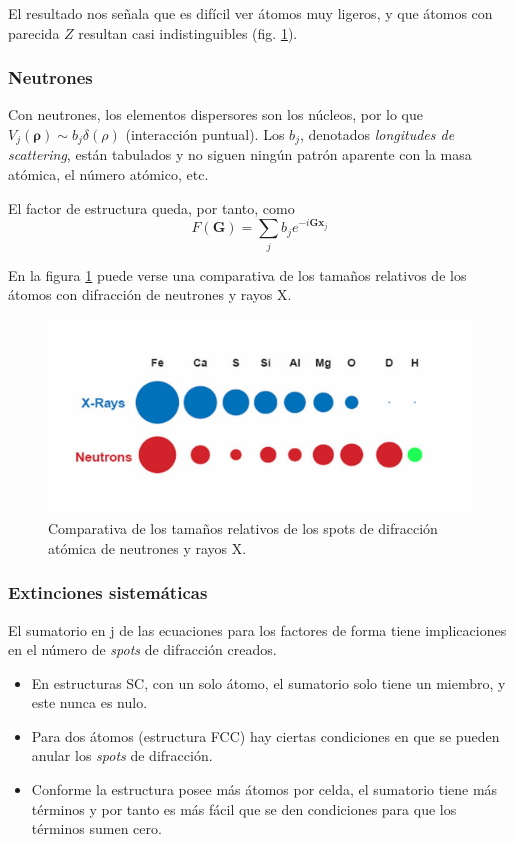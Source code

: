 El resultado nos señala que es difícil ver átomos muy ligeros, y que átomos con
parecida $Z$ resultan casi indistinguibles (fig. \ref{fig:xrne}).
\subsubsection{Neutrones}
Con neutrones, los elementos dispersores son los núcleos, por lo que
$V_j(\boldsymbol{\rho})\sim b_j \delta(\rho)$ (interacción puntual). Los $b_j$,
denotados \emph{longitudes de scattering}, están tabulados y no siguen ningún
patrón aparente con la masa atómica, el número atómico, etc. 

El factor de estructura queda, por tanto, como
\begin{equation}
  F(\mathbf{G}) = \sum_j b_j e ^{-i\mathbf{G}\mathbf{x}_j}
\end{equation}

En la figura \ref{fig:xrne} puede verse una comparativa de los tamaños relativos
de los átomos con difracción de neutrones y rayos X.

\begin{figure}
  \centering
  \includegraphics[width=\textwidth]{figures/xrne.png}
  \caption{Comparativa de los tamaños relativos de los spots de difracción
    atómica de neutrones y rayos X.}
  \label{fig:xrne}
\end{figure}

\subsubsection{Extinciones sistemáticas}
El sumatorio en j de las ecuaciones para los factores de forma tiene
implicaciones en el número de \emph{spots} de difracción creados.
\begin{itemize}
\item En estructuras SC, con un solo átomo, el sumatorio solo tiene un miembro,
  y este nunca es nulo.
\item Para dos átomos (estructura FCC) hay ciertas condiciones en que se pueden
  anular los \emph{spots} de difracción.
\item Conforme la estructura posee más átomos por celda, el sumatorio tiene más
  términos y por tanto es más fácil que se den condiciones para que los términos
  sumen cero.
\end{itemize}

